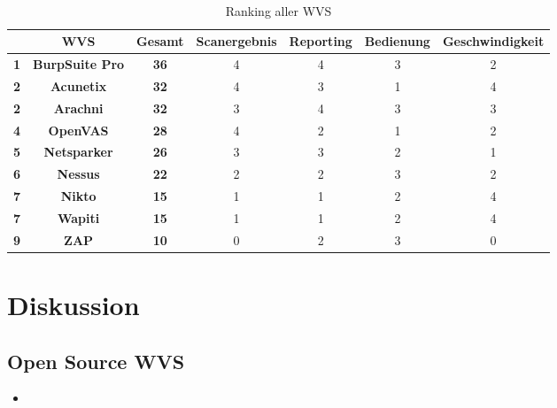 \documentclass[12pt,oneside,a4paper,parskip]{scrbook}
\begin{document}
     \ \\
     \begin{table}[H]
 \centering
 \begin{tabular}{|r|c|c|c|c|c|c|}
 \cline{2-7}
 \multicolumn{1}{l|}{} & \textbf{WVS}           & \textbf{Gesamt} & Scanergebnis & Reporting & Bedienung & Geschwindigkeit  \\
 \hline
 \textbf{1}            & \textbf{BurpSuite Pro} & \textbf{36}     & 4            & 4         & 3         & 2                \\
 \hline
 \textbf{2}            & \textbf{Acunetix}      & \textbf{32}     & 4            & 3         & 1         & 4                \\
 \hline
 \textbf{2}            & \textbf{Arachni}       & \textbf{32}     & 3            & 4         & 3         & 3                \\
 \hline
 \textbf{4}            & \textbf{OpenVAS}       & \textbf{28}     & 4            & 2         & 1         & 2                \\
 \hline
 \textbf{5}            & \textbf{Netsparker}    & \textbf{26}     & 3            & 3         & 2         & 1                \\
 \hline
 \textbf{6}            & \textbf{Nessus}        & \textbf{22}     & 2            & 2         & 3         & 2                \\
 \hline
 \textbf{7}            & \textbf{Nikto}         & \textbf{15}     & 1            & 1         & 2         & 4                \\
 \hline
 \textbf{7}            & \textbf{Wapiti}        & \textbf{15}     & 1            & 1         & 2         & 4                \\
 \hline
 \textbf{9}            & \textbf{ZAP}           & \textbf{10}     & 0            & 2         & 3         & 0                \\
 \hline
 \end{tabular}
 \caption[Ranking aller WVS]{Ranking aller WVS}
 \end{table}

\chapter{Diskussion}
  \section{Open Source WVS}
    \begin{itemize}
      \item

    \end{itemize}
\end{document}
